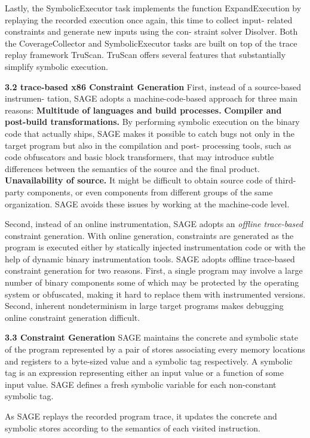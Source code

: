 Lastly, the SymbolicExecutor task implements the function ExpandExecution by replaying the recorded execution once again, this time to collect input- related constraints and generate new inputs using the con- straint solver Disolver.
Both the CoverageCollector and SymbolicExecutor tasks are built on top of the trace replay framework TruScan.
TruScan offers several features that substantially simplify symbolic execution.

\textbf{3.2 trace-based x86 Constraint Generation}
First, instead of a source-based instrumen- tation, SAGE adopts a machine-code-based approach for three main reasons:
\textbf{Multitude of languages and build processes.}
\textbf{Compiler and post-build transformations.} 
By performing symbolic execution on the binary code that actually ships, SAGE makes it possible to catch bugs not only in the target program but also in the compilation and post- processing tools, such as code obfuscators and basic block transformers, that may introduce subtle differences between the semantics of the source and the final product.
\textbf{Unavailability of source.} 
It might be difficult to obtain source code of third-party components, or even components from different groups of the same organization.
SAGE avoids these issues by working at the machine-code level.

Second, instead of an online instrumentation, SAGE adopts an \textit{offline trace-based} constraint generation. 
With online generation, constraints are generated as the program is executed either by statically injected instrumentation code or with the help of dynamic binary instrumentation tools.
SAGE adopts offline trace-based constraint generation for two reasons. 
First, a single program may involve a large number of binary components some of which may be protected by the operating system or obfuscated, making it hard to replace them with instrumented versions. 
Second, inherent nondeterminism in large target programs makes debugging online constraint generation difficult.

\textbf{3.3 Constraint Generation}
SAGE maintains the concrete and symbolic state of the program represented by a pair of stores associating every memory locations and registers to a byte-sized value and a symbolic tag respectively. 
A symbolic tag is an expression representing either an input value or a function of some input value.
SAGE defines a fresh symbolic variable for each non-constant symbolic tag.

As SAGE replays the recorded program trace, it updates the concrete and symbolic stores according to the semantics of each visited instruction.

